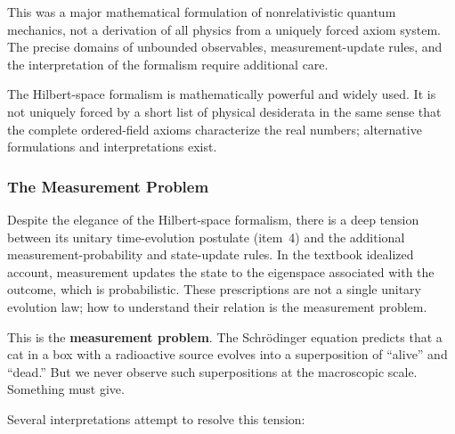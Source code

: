 This was a major mathematical formulation of nonrelativistic quantum mechanics, not a derivation of all physics from a uniquely forced axiom system. The precise domains of unbounded observables, measurement-update rules, and the interpretation of the formalism require additional care.

The Hilbert-space formalism is mathematically powerful and widely used. It is not uniquely forced by a short list of physical desiderata in the same sense that the complete ordered-field axioms characterize the real numbers; alternative formulations and interpretations exist.

\subsubsection{The Measurement Problem}

Despite the elegance of the Hilbert-space formalism, there is a deep tension between its unitary time-evolution postulate (item~4) and the additional measurement-probability and state-update rules. In the textbook idealized account, measurement updates the state to the eigenspace associated with the outcome, which is probabilistic. These prescriptions are not a single unitary evolution law; how to understand their relation is the measurement problem.

This is the \textbf{measurement problem}. The Schr\"odinger equation predicts that a cat in a box with a radioactive source evolves into a superposition of ``alive'' and ``dead.'' But we never observe such superpositions at the macroscopic scale. Something must give.

Several interpretations attempt to resolve this tension:

